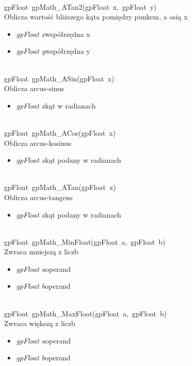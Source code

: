  \ \\
\mbox{\textsf{gpFloat gpMath_ATan2(gpFloat x, gpFloat y)}} \\ \indent Oblicza wartość bliższego kąta pomiędzy punkem, a osią x
	\begin{itemize}
		\item \textit{gpFloat x}\quad współrzędna x
		\item \textit{gpFloat y}\quad współrzędna y
	\end{itemize}

 \ \\
\mbox{\textsf{gpFloat gpMath_ASin(gpFloat x)}} \\ \indent Oblicza arcus-sinus
	\begin{itemize}
		\item \textit{gpFloat x}\quad kąt w radianach
	\end{itemize}

 \ \\
\mbox{\textsf{gpFloat gpMath_ACos(gpFloat x)}} \\ \indent Oblicza arcus-kosinus
	\begin{itemize}
		\item \textit{gpFloat x}\quad kąt podany w radianach
	\end{itemize}

 \ \\
\mbox{\textsf{gpFloat gpMath_ATan(gpFloat x)}} \\ \indent Oblicza arcus-tangens
	\begin{itemize}
		\item \textit{gpFloat x}\quad kąt podany w radianach
	\end{itemize}

 \ \\
\mbox{\textsf{gpFloat gpMath_MinFloat(gpFloat a, gpFloat b)}} \\ \indent Zwraca mniejszą z liczb
	\begin{itemize}
		\item \textit{gpFloat a}\quad operand
		\item \textit{gpFloat b}\quad operand
	\end{itemize}

 \ \\
\mbox{\textsf{gpFloat gpMath_MaxFloat(gpFloat a, gpFloat b)}} \\ \indent Zwraca większą z liczb
	\begin{itemize}
		\item \textit{gpFloat a}\quad operand
		\item \textit{gpFloat b}\quad operand
	\end{itemize}

